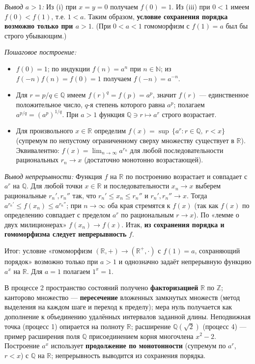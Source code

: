 \documentclass[11pt, a4paper]{extarticle}
\newcommand{\Z}{{\mathbb Z}}
\newcommand{\R}{{\mathbb R}}
\newcommand{\Q}{{\mathbb Q}}
\newcommand{\N}{{\mathbb N}}
\renewcommand{\le}{\leqslant}
\begin{document}
\begin{enumerate}[leftmargin=*, label=\textbf{Пример \arabic*.}]
\textit{Вывод $a > 1$:} Из (i) при $x=y=0$ получаем $f(0)=1$. Из (iii) при $0 < 1$ имеем $f(0) < f(1)$, т.е. $1 < a$. Таким образом, \textbf{условие сохранения порядка возможно только при $a > 1$}. (При $0 < a < 1$ гомоморфизм с $f(1)=a$ был бы строго убывающим.)

\textit{Пошаговое построение:}
\begin{itemize}[nosep]
    \item $f(0)=1$; по индукции $f(n)=a^n$ при $n \in \N$; из $f(-n)f(n)=f(0)=1$ получаем $f(-n)=a^{-n}$.
    \item Для $r = p/q \in \Q$ имеем $f(r)^q = f(p) = a^p$, значит $f(r)$ --- единственное положительное число, $q$-я степень которого равна $a^p$; полагаем $a^{p/q} = (a^p)^{1/q}$. При $a > 1$ функция $\Q \ni r \mapsto a^r$ строго возрастает.
    \item Для произвольного $x \in \R$ определим $f(x) = \sup\,\{ a^r : r \in \Q,\ r < x \}$ (супремум по непустому ограниченному сверху множеству существует в $\R$). Эквивалентно: $f(x) = \lim_{n\to\infty} a^{r_n}$ для любой последовательности рациональных $r_n \to x$ (достаточно монотонно возрастающей).
\end{itemize}

\textit{Вывод непрерывности:} Функция $f$ на $\R$ по построению возрастает и совпадает с $a^r$ на $\Q$. Для любой точки $x \in \R$ и последовательности $x_n \to x$ выберем рациональные $r_n', r_n''$ так, что $r_n' \le x_n \le r_n''$ и $r_n', r_n'' \to x$. Тогда $a^{r_n'} \le f(x_n) \le a^{r_n''}$; при $n \to \infty$ оба края стремятся к $f(x)$ (так как $f(x)$ по определению совпадает с пределом $a^r$ по рациональным $r \to x$). По «лемме о двух милиционерах» $f(x_n) \to f(x)$. Итак, \textbf{из сохранения порядка и гомоморфизма следует непрерывность} $f$.

Итог: условие «гомоморфизм $(\R,+) \to (\R^+, \cdot)$ с $f(1)=a$, сохраняющий порядок» возможно только при $a > 1$ и однозначно задаёт непрерывную функцию $a^x$ на $\R$. Для $a=1$ полагаем $1^x = 1$.
\end{enumerate}

\begin{remark}
В процессе 2 пространство состояний получено \textbf{факторизацией} $\R$ по $\Z$; канторово множество --- \textbf{пересечение} вложенных замкнутых множеств (метод выделения на каждом шаге и переход к пределу); мера нуль получается как дополнение к объединению удалённых интервалов заданной длины. Неподвижная точка (процесс 1) опирается на полноту $\R$; расширение $\Q(\sqrt{2})$ (процесс 4) --- пример расширения поля $\Q$ присоединением корня многочлена $x^2 - 2$. Построение $a^x$ использует \textbf{продолжение по монотонности} (супремум по $a^r$, $r<x$) с $\Q$ на $\R$; непрерывность выводится из сохранения порядка.
\end{remark}
\end{document}

